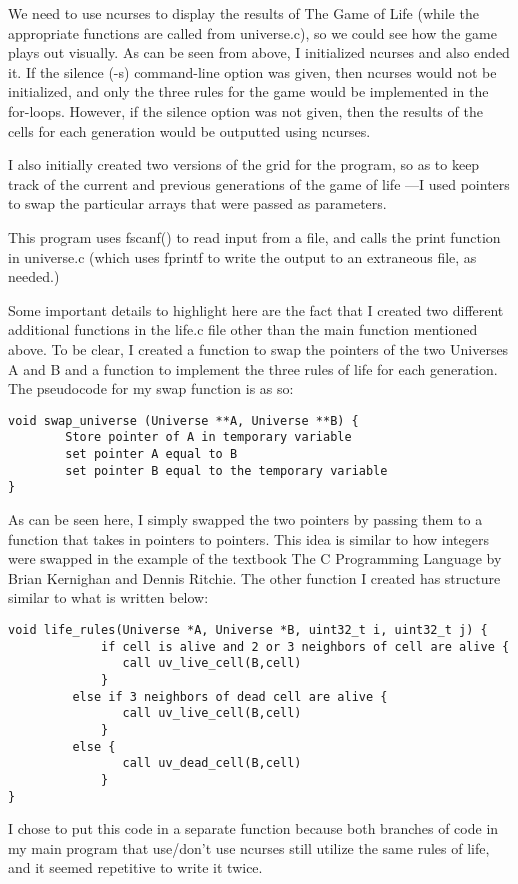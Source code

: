 \documentclass[11pt]{article}
\begin{document}
We need to use ncurses to display the results of The Game of Life (while the appropriate functions are called from universe.c), so we could see how the game plays out visually. As can be seen from above, I initialized ncurses and also ended it. If the silence (-s) command-line option was given, then  ncurses would not be initialized, and only the three rules for the game would be implemented in the for-loops. However, if the silence option was not given, then the results of the cells for each generation would be outputted using ncurses.

I also initially created two versions of the grid for the program, so as to keep track of the current and previous generations of the game of life ---I used pointers to swap the particular arrays that were passed as parameters. 

This program uses fscanf() to read input from a file, and calls the print function in universe.c (which uses fprintf to write the output to an extraneous file, as needed.)

Some important details to highlight here are the fact that I created two different additional functions in the life.c file other than the main function mentioned above. To be clear, I created a function to swap the pointers of the two Universes A and B and a function to implement the three rules of life for each generation. The pseudocode for my swap function is as so:
\begin{verbatim}
void swap_universe (Universe **A, Universe **B) {
        Store pointer of A in temporary variable
        set pointer A equal to B
        set pointer B equal to the temporary variable 
}
\end{verbatim}

As can be seen here, I simply swapped the two pointers by passing them to a function that takes in pointers to pointers. This idea is similar to how integers were swapped in the example of the textbook The C Programming Language by Brian Kernighan and Dennis Ritchie. The other function I created has structure similar to what is written below:
\begin{verbatim}
void life_rules(Universe *A, Universe *B, uint32_t i, uint32_t j) {
             if cell is alive and 2 or 3 neighbors of cell are alive {
                call uv_live_cell(B,cell)
             }
	     else if 3 neighbors of dead cell are alive {
                call uv_live_cell(B,cell)
             }
	     else {
                call uv_dead_cell(B,cell)
             }
}
\end{verbatim}
I chose to put this code in a separate function because both branches of code in my main program that use/don't use ncurses still utilize the same rules of life, and it seemed repetitive to write it twice.
\end{document}
